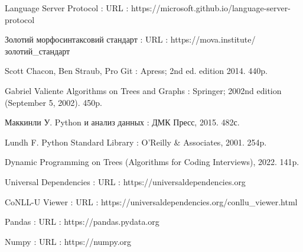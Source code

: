 \begin{thebibliography}{99}
Language Server Protocol : URL :
https://microsoft.github.io/language-server-protocol

Золотий морфосинтаксовий стандарт : URL :
https://mova.institute/золотий\_стандарт



Scott Chacon, Ben Straub, Pro Git : Apress; 2nd ed. edition 2014. 440p.

Gabriel Valiente Algorithms on Trees and Graphs : Springer; 2002nd edition (September 5, 2002). 450p.

Маккинли У. Python и анализ данных : ДМК Пресс, 2015. 482с.

Lundh F. Python Standard Library : O’Reilly \& Associates, 2001. 254p.

Dynamic Programming on Trees (Algorithms for Coding Interviews), 2022. 141p.

Universal Dependencies : URL : https://universaldependencies.org

CoNLL-U Viewer : URL : https://universaldependencies.org/conllu\_viewer.html

Pandas : URL : https://pandas.pydata.org

Numpy : URL : https://numpy.org


\end{thebibliography}